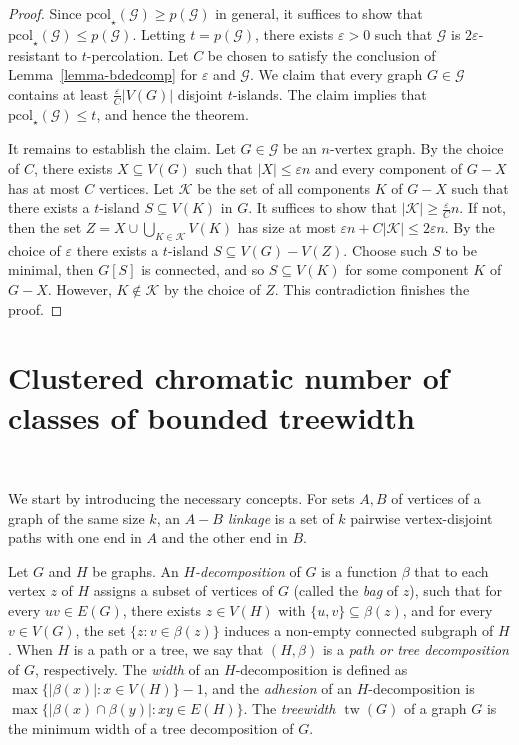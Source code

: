 \documentclass[12pt]{article}
\newcommand{\eps}{\varepsilon}
\newcommand{\mc}[1]{\mathcal{#1}}
\newcommand{\brm}[1]{\operatorname{#1}}
\begin{document}
\begin{proof} Since $\text{pcol}_\star(\mc{G})\ge p(\mc{G})$ in general, it suffices to show
that $\text{pcol}_\star(\mc{G})\le p(\mc{G})$. Letting $t=p(\mc{G})$, there exists $\eps> 0$ such that $\mc{G}$ is $2\eps$-resistant to $t$-percolation.
Let $C$ be chosen to satisfy the conclusion of Lemma~\ref{lemma-bdedcomp} for 
$\varepsilon$ and $\mc{G}$.   We claim that every graph $G \in \mc{G}$ contains at least $\frac{\eps}{C}|V(G)|$ disjoint $t$-islands.
The claim implies that $\text{pcol}_\star(\mc{G}) \leq t$, and hence the theorem.
	
It remains to establish the claim. Let $G \in \mc{G}$ be an $n$-vertex graph.  By the choice of $C$, there exists $X \subseteq V(G)$ such that
$|X|\le \varepsilon n$ and every component of $G - X$ has at most $C$ vertices.
Let $\mc{K}$ be the set of all components $K$ of $G - X$ such that there exists a $t$-island $S \subseteq V(K)$ in $G$.
It suffices to show that $|\mc{K}| \geq \frac{\eps}{C}n$. If not, then the set $Z = X \cup \bigcup_{K \in \mc{K}}V(K)$
has size at most $\eps n + C|\mc{K}|\leq 2\eps n$. By the choice of $\eps$ there exists a $t$-island $S \subseteq V(G) - V(Z)$. Choose such $S$ to be minimal, then $G[S]$ is connected, and so $S \subseteq V(K)$ for some component $K$ of $G-X$. However,  $K \not \in \mc{K}$ by the choice of $Z$. This contradiction finishes the proof. 
\end{proof}	

\section{Clustered chromatic number of classes of bounded treewidth}~\label{sec-treedec}

We start by introducing the necessary concepts.
For sets $A,B$ of vertices of a graph of the same size $k$, an \emph{$A-B$ linkage} is a set of $k$ pairwise vertex-disjoint paths
with one end in $A$ and the other end in $B$.

Let $G$ and $H$ be graphs.  An \emph{$H$-decomposition} of $G$ is a function $\beta$ that to each vertex $z$ of $H$ assigns a subset of
vertices of $G$ (called the \emph{bag} of $z$), such that for every $uv\in E(G)$, there exists $z\in V(H)$ with $\{u,v\}\subseteq \beta(z)$, and
for every $v\in V(G)$, the set $\{z:v\in\beta(z)\}$ induces a non-empty connected subgraph of $H$.  When $H$ is a path or
a tree, we say that $(H,\beta)$ is a \emph{path or tree decomposition} of $G$, respectively.  The \emph{width} of an $H$-decomposition is defined as  $\max\{|\beta(x)|:x\in V(H)\}-1$, and the \emph{adhesion}
of an $H$-decomposition is  $\max\{|\beta(x)\cap\beta(y)|:xy\in E(H)\}$. The \emph{treewidth $\brm{tw}(G)$} of a graph $G$ is the minimum width of a tree decomposition of $G$.
\end{document}
